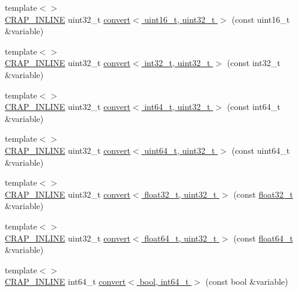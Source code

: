 \begin{DoxyCompactItemize}
\item 
{\footnotesize template$<$$>$ }\\\hyperlink{config__x86_8h_a5a40526b8d842e7ff731509998bb0f1c}{C\+R\+A\+P\+\_\+\+I\+N\+L\+I\+N\+E} uint32\+\_\+t \hyperlink{namespacecrap_a6b334f886e5674b8046ef1768ea73fa6}{convert$<$ uint16\+\_\+t, uint32\+\_\+t $>$} (const uint16\+\_\+t \&variable)
\item 
{\footnotesize template$<$$>$ }\\\hyperlink{config__x86_8h_a5a40526b8d842e7ff731509998bb0f1c}{C\+R\+A\+P\+\_\+\+I\+N\+L\+I\+N\+E} uint32\+\_\+t \hyperlink{namespacecrap_aa287c43c18e43139d5f4f983600744b8}{convert$<$ int32\+\_\+t, uint32\+\_\+t $>$} (const int32\+\_\+t \&variable)
\item 
{\footnotesize template$<$$>$ }\\\hyperlink{config__x86_8h_a5a40526b8d842e7ff731509998bb0f1c}{C\+R\+A\+P\+\_\+\+I\+N\+L\+I\+N\+E} uint32\+\_\+t \hyperlink{namespacecrap_abd6ca924d7770e701496a58203117557}{convert$<$ int64\+\_\+t, uint32\+\_\+t $>$} (const int64\+\_\+t \&variable)
\item 
{\footnotesize template$<$$>$ }\\\hyperlink{config__x86_8h_a5a40526b8d842e7ff731509998bb0f1c}{C\+R\+A\+P\+\_\+\+I\+N\+L\+I\+N\+E} uint32\+\_\+t \hyperlink{namespacecrap_a81ce6b5e98545b85b8e7422c84baa748}{convert$<$ uint64\+\_\+t, uint32\+\_\+t $>$} (const uint64\+\_\+t \&variable)
\item 
{\footnotesize template$<$$>$ }\\\hyperlink{config__x86_8h_a5a40526b8d842e7ff731509998bb0f1c}{C\+R\+A\+P\+\_\+\+I\+N\+L\+I\+N\+E} uint32\+\_\+t \hyperlink{namespacecrap_a4887e3e1e080a125d1fcf5d1a919a779}{convert$<$ float32\+\_\+t, uint32\+\_\+t $>$} (const \hyperlink{crap__types_8h_a4611b605e45ab401f02cab15c5e38715}{float32\+\_\+t} \&variable)
\item 
{\footnotesize template$<$$>$ }\\\hyperlink{config__x86_8h_a5a40526b8d842e7ff731509998bb0f1c}{C\+R\+A\+P\+\_\+\+I\+N\+L\+I\+N\+E} uint32\+\_\+t \hyperlink{namespacecrap_ad5f38be538af7cc35e5b0aaea508ef2d}{convert$<$ float64\+\_\+t, uint32\+\_\+t $>$} (const \hyperlink{crap__types_8h_ac55f3ae81b5bc9053760baacf57e47f4}{float64\+\_\+t} \&variable)
\item 
{\footnotesize template$<$$>$ }\\\hyperlink{config__x86_8h_a5a40526b8d842e7ff731509998bb0f1c}{C\+R\+A\+P\+\_\+\+I\+N\+L\+I\+N\+E} int64\+\_\+t \hyperlink{namespacecrap_abe992f6296bfcaefca732ef4c64e1fac}{convert$<$ bool, int64\+\_\+t $>$} (const bool \&variable)

\end{DoxyCompactItemize}
